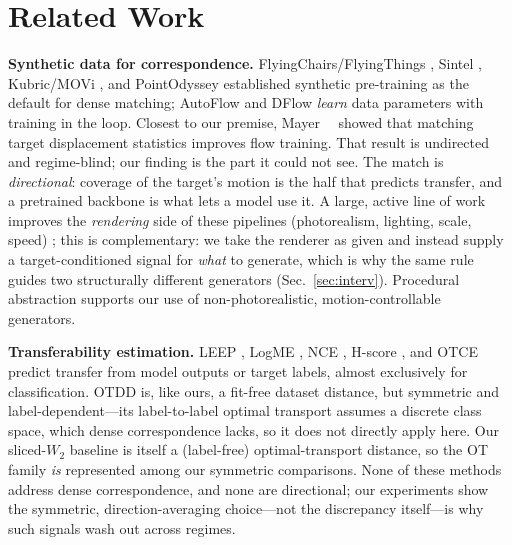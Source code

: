 \section{Related Work}
\label{sec:related}

\noindent\textbf{Synthetic data for correspondence.}
FlyingChairs/FlyingThings \cite{mayer2016FlyingThingsDataset}, Sintel
\cite{sintel}, Kubric/MOVi \cite{greff2021kubric}, and PointOdyssey
\cite{pointodyssey} established synthetic pre-training as the default for
dense matching; AutoFlow \cite{sun2021autoflow} and DFlow \cite{im2022dflow}
\emph{learn} data parameters with training in the loop. Closest to our
premise, Mayer~\etal~\cite{mayer2018what} showed that matching target
displacement statistics improves flow training. That result is undirected and
regime-blind; our finding is the part it could not see. The match is
\emph{directional}: coverage of the target's motion is the half that predicts
transfer, and a pretrained backbone is what lets a model use it. A large, active
line of work improves the \emph{rendering} side of these pipelines (photorealism,
lighting, scale, speed) \cite{greff2021kubric,pointodyssey}; this is complementary:
we take the renderer as given and instead supply a target-conditioned signal for
\emph{what} to generate, which is why the same rule guides two structurally
different generators (Sec.~\ref{sec:interv}).
Procedural abstraction \cite{Baradad2021LookingAtNoise,white2009mandelbulb}
supports our use of non-photorealistic, motion-controllable generators.

\noindent\textbf{Transferability estimation.}
LEEP \cite{nguyen2020leep}, LogME \cite{you2021logme}, NCE
\cite{tran2019transferability}, H-score \cite{bao2019information}, and OTCE
\cite{tan2021otce} predict transfer from model outputs or target labels,
almost exclusively for classification. OTDD \cite{alvarez2020geometric} is,
like ours, a fit-free dataset distance, but symmetric and label-dependent---its
label-to-label optimal transport assumes a discrete class space, which dense
correspondence lacks, so it does not directly apply here. Our sliced-$W_2$ baseline
is itself a (label-free) optimal-transport distance, so the OT family \emph{is}
represented among our symmetric comparisons. None of these methods address dense
correspondence, and none are directional; our experiments show the symmetric,
direction-averaging choice---not the discrepancy itself---is why such signals wash
out across regimes.

